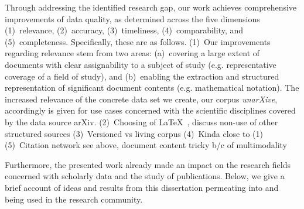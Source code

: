Through addressing the identified research gap, our work achieves comprehensive improvements of data quality, as determined across the five dimensions (1)~relevance, (2)~accuracy, (3)~timeliness, (4)~comparability, and (5)~completeness. Specifically, these are as follows.
(1)~Our improvements regarding relevance stem from two areas: (a)~covering a large extent of documents with clear assignability to a subject of study (e.g. representative coverage of a field of study), and (b)~enabling the extraction and structured representation of significant document contents (e.g. mathematical notation). The increased relevance of the concrete data set we create, our corpus \textit{unarXive}, accordingly is given for use cases concerned with the scientific disciplines covered by the data source arXiv.
(2)~Choosing of \LaTeX\ , discuss non-use of other structured sources
(3)~Versioned vs living corpus
(4)~Kinda close to (1)
(5)~Citation network see above, document content tricky b/c of multimodality

Furthermore, the presented work already made an impact on the research fields concerned with scholarly data and the study of publications. Below, we give a brief account of ideas and results from this dissertation permeating into and being used in the research community.

